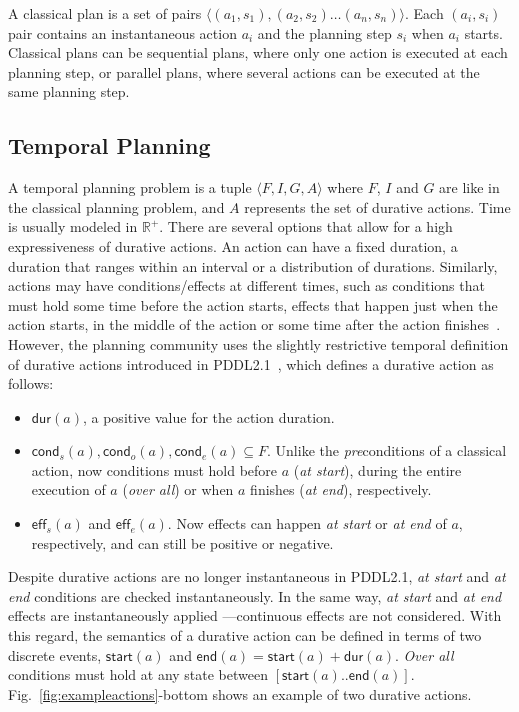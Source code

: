 \documentclass[runningheads]{llncs}
\newcommand{\tup}[1]{{\langle #1 \rangle}}
\newcommand{\eff}{\mathsf{eff}}    %
\newcommand{\cond}{\mathsf{cond}}  %
\newcommand{\dur}{\mathsf{dur}}    %
\newcommand{\start}{\mathsf{start}}%
\newcommand{\en}{\mathsf{end}}     %
\begin{document}
A classical plan is a set of pairs $\tup{(a_1,s_1),(a_2,s_2)\ldots (a_n,s_n)}$. Each $(a_i,s_i)$ pair contains an instantaneous action $a_i$ and the planning step $s_i$ when $a_i$ starts. Classical plans can be sequential plans, where only one action is executed at each planning step, or parallel plans, where several actions can be executed at the same planning step.



\subsection{Temporal Planning}
\label{sec:temporalplanning}

A temporal planning problem is a tuple $\tup{F,I,G,A}$ where $F$, $I$ and $G$ are like in the classical planning problem, and $A$ represents the set of durative actions. Time is usually modeled in
$\mathbb{R}^+$.
There are several options that allow for a high expressiveness of durative actions. An action can have a fixed duration, a duration that ranges within an interval or a distribution of durations. Similarly, actions may have conditions/effects at different times, such as conditions that must hold some time before the action starts, effects that happen just when the action starts, in the middle of the action or some time after the action finishes~\cite{garrido2009constraint}.
However, the planning community uses the slightly restrictive temporal definition of durative actions introduced in PDDL2.1~\cite{fox2003pddl2}, which defines a durative action as follows:

\begin{itemize}

\item $\dur(a)$, a positive value for the action duration.

\item $\cond_s(a), \cond_o(a), \cond_e(a) \subseteq F$. Unlike the \emph{pre}conditions of a classical action, now conditions must hold before $a$ ({\em at start}), during the entire execution of $a$ ({\em over all}) or when $a$ finishes ({\em at end}), respectively.

\item $\eff_s(a)$ and $\eff_e(a)$. Now effects can happen {\em at start} or {\em at end} of $a$, respectively, and can still be positive or negative.

\end{itemize}


Despite durative actions are no longer instantaneous in PDDL2.1, {\em at start} and {\em at end} conditions are checked instantaneously. In the same way, {\em at start} and {\em at end} effects are instantaneously applied ---continuous effects are not considered. With this regard, the semantics of a durative action can be defined in terms of two discrete events, $\start(a)$ and $\en(a)=\start(a)+\dur(a)$.
{\em Over all} conditions must hold at any state between $[\start(a)..\en(a)]$. Fig.~\ref{fig:exampleactions}-bottom shows an example of two durative actions.
\end{document}
